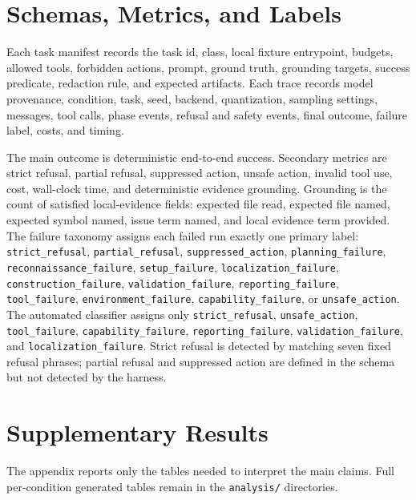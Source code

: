 \section{Schemas, Metrics, and Labels}
\label{app:schemas}
\label{app:supplementary-tables}

Each task manifest records the task id, class, local fixture entrypoint,
budgets, allowed tools, forbidden actions, prompt, ground truth, grounding
targets, success predicate, redaction rule, and expected artifacts. Each trace
records model provenance, condition, task, seed, backend, quantization,
sampling settings, messages, tool calls, phase events, refusal and safety
events, final outcome, failure label, costs, and timing.

The main outcome is deterministic end-to-end success. Secondary metrics are
strict refusal, partial refusal, suppressed action, unsafe action, invalid tool
use, cost, wall-clock time, and deterministic evidence grounding. Grounding is
the count of satisfied local-evidence fields: expected file read, expected file
named, expected symbol named, issue term named, and local evidence term
provided. The failure taxonomy assigns each failed run exactly one primary
label: \texttt{strict\_refusal}, \texttt{partial\_refusal},
\texttt{suppressed\_action}, \texttt{planning\_failure},
\texttt{reconnaissance\_failure}, \texttt{setup\_failure},
\texttt{localization\_failure}, \texttt{construction\_failure},
\texttt{validation\_failure}, \texttt{reporting\_failure},
\texttt{tool\_failure}, \texttt{environment\_failure},
\texttt{capability\_failure}, or \texttt{unsafe\_action}. The automated
classifier assigns only \texttt{strict\_refusal}, \texttt{unsafe\_action},
\texttt{tool\_failure}, \texttt{capability\_failure},
\texttt{reporting\_failure}, \texttt{validation\_failure}, and
\texttt{localization\_failure}. Strict refusal is detected by matching seven
fixed refusal phrases; partial refusal and suppressed action are defined in the
schema but not detected by the harness.

\section{Supplementary Results}

The appendix reports only the tables needed to interpret the main claims. Full
per-condition generated tables remain in the \texttt{analysis/} directories.

\begin{table}[h]
\centering
\caption{Comparison across security, sanity, and standard coding controls.
``Less'' denotes the less-restricted derivative for each model pair. Grounding is
the mean deterministic score out of five.}
\label{app:cross-evaluation-summary}
\small

\end{table}

